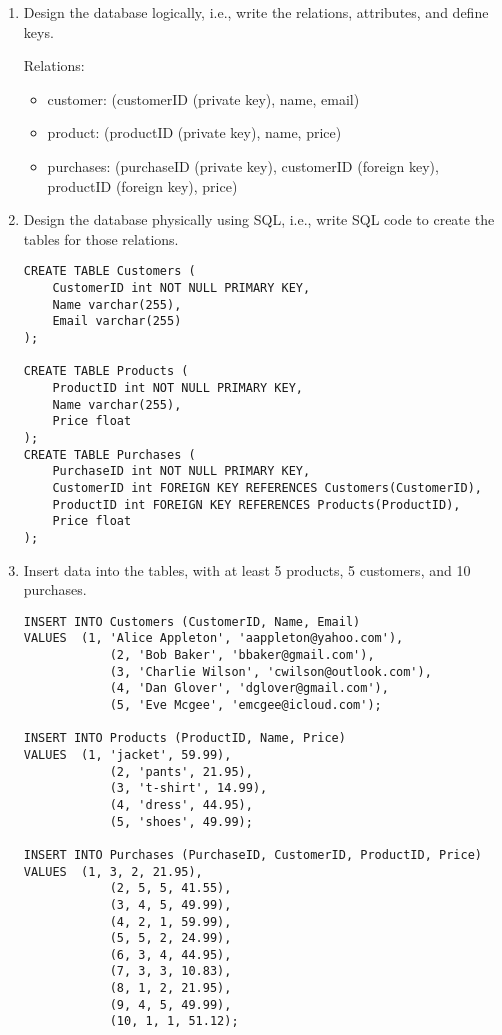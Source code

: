 \documentclass[notitlepage, 11pt]{report}
\begin{document}
\begin{enumerate}[itemindent=-1.5em]
\begin{center}
	\end{center}
	\item Design the database logically, i.e., write the relations, attributes, and define keys.
	
	Relations:
	\begin{itemize}
		\item customer: (customerID (private key), name, email)
		\item product: (productID (private key), name, price)
		\item purchases: (purchaseID (private key), customerID (foreign key), productID (foreign key), price)
	\end{itemize}
\newpage
	\item Design the database physically using SQL, i.e., write SQL code to create the tables for those relations.
\Suppressnumber
\begin{lstlisting}
CREATE TABLE Customers (
	CustomerID int NOT NULL PRIMARY KEY,
	Name varchar(255),
	Email varchar(255)
);

CREATE TABLE Products (
	ProductID int NOT NULL PRIMARY KEY,
	Name varchar(255),
	Price float
);
CREATE TABLE Purchases (
	PurchaseID int NOT NULL PRIMARY KEY,
	CustomerID int FOREIGN KEY REFERENCES Customers(CustomerID),
	ProductID int FOREIGN KEY REFERENCES Products(ProductID),
	Price float
);
\end{lstlisting}
	\item Insert data into the tables, with at least 5 products, 5 customers, and 10 purchases.
\begin{lstlisting}
INSERT INTO Customers (CustomerID, Name, Email)
VALUES	(1, 'Alice Appleton', 'aappleton@yahoo.com'),
			(2, 'Bob Baker', 'bbaker@gmail.com'),
			(3, 'Charlie Wilson', 'cwilson@outlook.com'),
			(4, 'Dan Glover', 'dglover@gmail.com'),
			(5, 'Eve Mcgee', 'emcgee@icloud.com');

INSERT INTO Products (ProductID, Name, Price)
VALUES	(1, 'jacket', 59.99),
			(2, 'pants', 21.95),
			(3, 't-shirt', 14.99),
			(4, 'dress', 44.95),
			(5, 'shoes', 49.99);

INSERT INTO Purchases (PurchaseID, CustomerID, ProductID, Price)
VALUES	(1, 3, 2, 21.95),
			(2, 5, 5, 41.55),
			(3, 4, 5, 49.99),
			(4, 2, 1, 59.99),
			(5, 5, 2, 24.99),
			(6, 3, 4, 44.95),
			(7, 3, 3, 10.83),
			(8, 1, 2, 21.95),
			(9, 4, 5, 49.99),
			(10, 1, 1, 51.12);
\end{lstlisting}
\end{enumerate}
\end{document}
